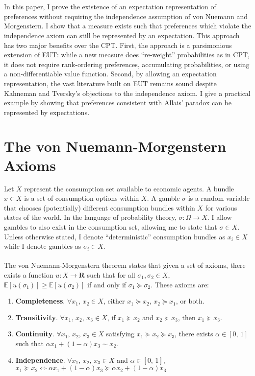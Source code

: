 \documentclass{article}
\begin{document}
\\
\\
In this paper, I prove the existence of an expectation representation of preferences without requiring the independence assumption of von Nuemann and Morgenstern.  I show that a measure exists such that preferences which violate the independence axiom can still be represented by an expectation.  This approach has two major benefits over the CPT.  First, the approach is a parsimonious extension of EUT: while a new measure does ``re-weight'' probabilities as in CPT, it does not require rank-ordering preferences, accumulating probabilities, or using a non-differentiable value function.  Second, by allowing an expectation representation, the vast literature built on EUT remains sound despite Kahneman and Tversky's objections to the independence axiom. I give a practical example by showing that preferences consistent with Allais' paradox can be represented by expectations.  

\section{The von Nuemann-Morgenstern Axioms}

Let \(X\) represent the consumption set available to economic agents.  A bundle \(x \in X\) is a set of consumption options within \(X\).  A gamble \(\sigma\) is a random variable that chooses (potentially) different consumption bundles within \(X\) for various states of the world.  In the language of probability theory, \(\sigma: \Omega \to X\).  I allow gambles to also exist in the consumption set, allowing me to state that \(\sigma \in X\).  Unless otherwise stated, I denote ``deterministic'' consumption bundles as \(x_i \in X\) while I denote gambles as \(\sigma_i \in X\). 
\\
\\
The von Nuemann-Morgenstern theorem states that given a set of axioms, there exists a function \(u: X \to \mathbf{R}\) such that for all \(\sigma_1, \sigma_2 \in X\), \(\mathbb{E}\left[u(\sigma_1)\right] \geq \mathbb{E}\left[u(\sigma_2)\right]\) if and only if \(\sigma_1 \succeq  \sigma_2\).  These axioms are:

\begin{enumerate}
	\item \textbf{Completeness}.  \(\forall x_1, \, x_2 \in X\), either \(x_1 \succeq  x_2\), \(x_2 \succeq  x_1\), or both.
	\item \textbf{Transitivity}.  \(\forall x_1, \, x_2,\, x_3 \in X\), if \(x_1 \succeq  x_2\) and \(x_2 \succeq  x_3\), then \(x_1 \succeq  x_3\).
	\item \textbf{Continuity}.  \(\forall x_1, \, x_2,\,x_3 \in X\) satisfying \(x_1 \succeq  x_2 \succeq  x_3\), there exists \(\alpha \in [0,\,1]\) such that \(\alpha x_1+(1-\alpha) x_3 \sim x_2\).
	\item \textbf{Independence}.  \(\forall x_1, \, x_2,\,x_3 \in X\) and \(\alpha \in [0,\,1]\), \(x_1 \succeq  x_2 \Leftrightarrow \alpha x_1+(1-\alpha)x_3 \succeq  \alpha x_2 +(1-\alpha)x_3\)
\end{enumerate}
\end{document}
